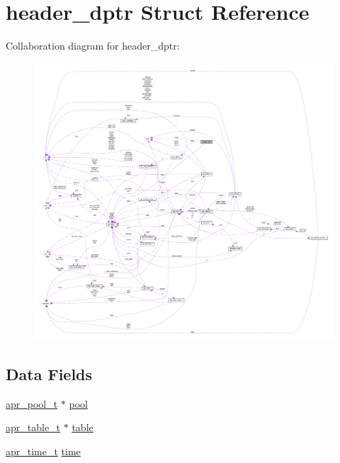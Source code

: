 \hypertarget{structheader__dptr}{}\section{header\+\_\+dptr Struct Reference}
\label{structheader__dptr}


Collaboration diagram for header\+\_\+dptr\+:
\nopagebreak
\begin{figure}[H]
\begin{center}
\leavevmode
\includegraphics[width=350pt]{structheader__dptr__coll__graph}
\end{center}
\end{figure}
\subsection*{Data Fields}
\begin{DoxyCompactItemize}
\item 
\hyperlink{structapr__pool__t}{apr\+\_\+pool\+\_\+t} $\ast$ \hyperlink{structheader__dptr_a1c0a41c0559197a82498d4b482475ee1}{pool}
\item 
\hyperlink{structapr__table__t}{apr\+\_\+table\+\_\+t} $\ast$ \hyperlink{structheader__dptr_ad4ae52ed1ea13a606656d05bed09c044}{table}
\item 
\hyperlink{group__apr__time_gadb4bde16055748190eae190c55aa02bb}{apr\+\_\+time\+\_\+t} \hyperlink{structheader__dptr_a4a15fcc5500e1358374583274b5c17b4}{time}
\end{DoxyCompactItemize}


